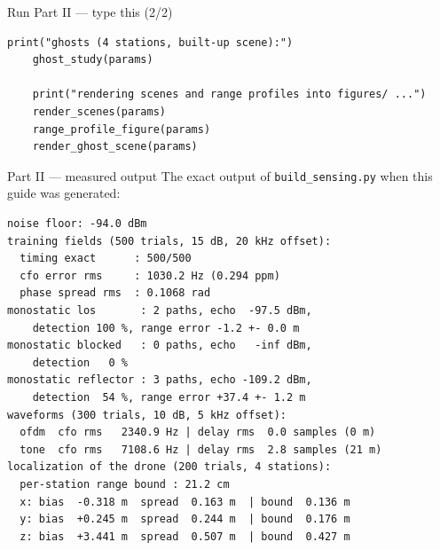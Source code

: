\documentclass[10pt]{beamer}
\begin{document}
\begin{frame}[fragile]{Run Part II --- type this (2/2)}
\begin{lstlisting}[basicstyle=\ttfamily\tiny]
    print("ghosts (4 stations, built-up scene):")
    ghost_study(params)

    print("rendering scenes and range profiles into figures/ ...")
    render_scenes(params)
    range_profile_figure(params)
    render_ghost_scene(params)
\end{lstlisting}
\end{frame}

\begin{frame}[fragile]{Part II --- measured output}
  The exact output of \texttt{build\_sensing.py} when this
  guide was generated:
\begin{lstlisting}[language={},basicstyle=\ttfamily\tiny]
noise floor: -94.0 dBm
training fields (500 trials, 15 dB, 20 kHz offset):
  timing exact      : 500/500
  cfo error rms     : 1030.2 Hz (0.294 ppm)
  phase spread rms  : 0.1068 rad
monostatic los       : 2 paths, echo  -97.5 dBm,
    detection 100 %, range error -1.2 +- 0.0 m
monostatic blocked   : 0 paths, echo   -inf dBm,
    detection   0 %
monostatic reflector : 3 paths, echo -109.2 dBm,
    detection  54 %, range error +37.4 +- 1.2 m
waveforms (300 trials, 10 dB, 5 kHz offset):
  ofdm  cfo rms   2340.9 Hz | delay rms  0.0 samples (0 m)
  tone  cfo rms   7108.6 Hz | delay rms  2.8 samples (21 m)
localization of the drone (200 trials, 4 stations):
  per-station range bound : 21.2 cm
  x: bias  -0.318 m  spread  0.163 m  | bound  0.136 m
  y: bias  +0.245 m  spread  0.244 m  | bound  0.176 m
  z: bias  +3.441 m  spread  0.507 m  | bound  0.427 m
\end{lstlisting}
\end{frame}
\end{document}
